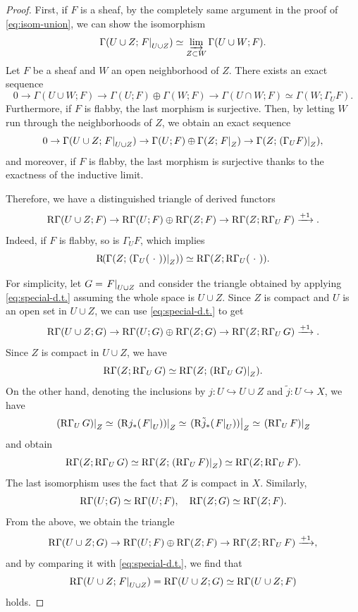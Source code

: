\begin{proof}
  First, if \(F\) is a sheaf, 
  by the completely same argument in the proof of \eqref{eq:isom-union}, 
  we can show the isomorphism
  \[
    \Gamma(U \cup Z; \mres[F]{U \cup Z}) \simeq \indlim[Z \subset W] \Gamma(U \cup W; F).
  \]
  Let \(F\) be a sheaf 
  and \(W\) an open neighborhood of \(Z\). 
  There exists an exact sequence
  \[
    0 \to \Gamma(U \cup W; F) \to \Gamma(U; F) \oplus \Gamma(W; F) \to \Gamma(U \cap W; F) \simeq \Gamma(W; \Gamma_U F).
  \]
  Furthermore, if \(F\) is flabby, 
  the last morphism is surjective. 
  Then, by letting \(W\) run through 
  the neighborhoods of \(Z\), we obtain an exact sequence
  \[
    0 \to \Gamma(U \cup Z; \mres[F]{U \cup Z}) \to \Gamma(U; F) \oplus \Gamma(Z; \mres[F]{Z}) \to \Gamma(Z; \mres[(\Gamma_U F)]{Z}),
  \]
  and moreover, if \(F\) is flabby, 
  the last morphism is surjective thanks to the exactness 
  of the inductive limit.

  Therefore, we have a distinguished triangle of derived functors
  \begin{equation}\label{eq:special-d.t.}
    \RG(U \cup Z; F) \to \RG(U; F) \oplus \RG(Z; F) \to \RG(Z; \RG_U F) \xrightarrow{+1}.
  \end{equation}
  Indeed, if \(F\) is flabby, 
  so is \(\Gamma_U F\), which implies
  \[
    \Rder(\Gamma(Z; \mres[(\Gamma_U(\blk))]{Z})) 
    \simeq 
    \RG(Z; \RG_U(\blk)).
  \]

  For simplicity, 
  let \(G = \mres[F]{U \cup Z}\) and 
  consider the triangle obtained 
  by applying \eqref{eq:special-d.t.} 
  assuming the whole space is \(U \cup Z\).  
  Since \(Z\) is compact and \(U\) is an open set 
  in \(U \cup Z\), 
  we can use \eqref{eq:special-d.t.} 
  to get
  \[
    \RG(U \cup Z; G) \to 
    \RG(U; G) \oplus \RG(Z; G) 
    \to \RG(Z; \RG_U G) \xrightarrow{+1}.
  \]
  Since \(Z\) is compact in \(U \cup Z\), 
  we have
  \[
    \RG(Z; \RG_U G) \simeq \RG(Z; \mres[(\RG_U G)]{Z}).
  \]
  On the other hand, 
  denoting the inclusions by
  \(j \colon U \hookrightarrow U \cup Z\) and 
  \(\tilde{j} \colon U \hookrightarrow X\), 
  we have
  \[
    \mres[(\RG_U G)]{Z} 
    \simeq 
    \mres[{(\Rder j_{\ast}(\mres[F]{U}))}]{Z} 
    \simeq 
    \mres[{(\Rder\tilde{j}_{\ast}(\mres[F]{U}))}]{Z} 
    \simeq \mres[(\RG_U F)]{Z}
  \]
  and obtain
  \[
    \RG(Z; \RG_U G) \simeq \RG(Z; \mres[(\RG_U F)]{Z}) \simeq \RG(Z; \RG_U F).
  \]
  The last isomorphism uses the fact that \(Z\) is compact in \(X\). Similarly,
  \[
    \RG(U; G) \simeq \RG(U; F), \quad \RG(Z; G) \simeq \RG(Z; F).
  \]
  From the above, we obtain the triangle
  \[
    \RG(U \cup Z; G) \to \RG(U; F) \oplus \RG(Z; F) \to \RG(Z; \RG_U F) \xrightarrow{+1},
  \]
  and by comparing it with \eqref{eq:special-d.t.}, 
  we find that
  \[
    \RG(U \cup Z; \mres[F]{U \cup Z}) = \RG(U \cup Z; G) \simeq \RG(U \cup Z; F)
  \]
  holds.
\end{proof}

